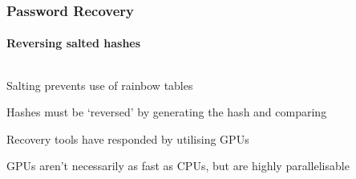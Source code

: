 \documentclass[handout, notes=hide]{beamer}
\begin{document}

\begin{frame}
\frametitle{Password Recovery}
\framesubtitle{Reversing salted hashes}
\setlength{\parskip}{0.5em}

\begin{columns}[T]
\begin{column}[T]{1.0\textwidth}
\setlength{\parskip}{0.5em}
Salting prevents use of rainbow tables

Hashes must be `reversed' by generating the hash and comparing

Recovery tools have responded by utilising GPUs

GPUs aren't necessarily as fast as CPUs, but are highly parallelisable

\end{column}
\end{columns}


\end{frame}

\end{document}
